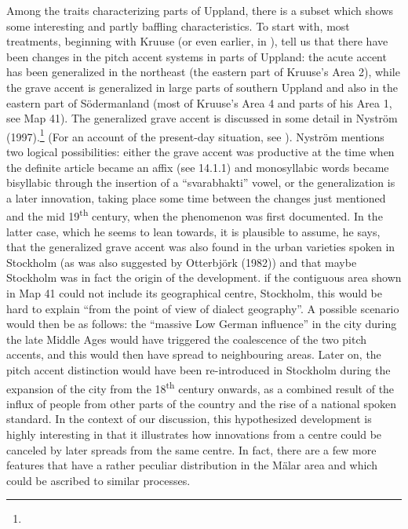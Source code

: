 \begin{styleBodytextC}
Among the traits characterizing parts of Uppland, there is a subset which shows some interesting and partly baffling characteristics. To start with, most treatments, beginning with Kruuse (or even earlier, in \citet{Rydqvist1868}), tell us that there have been changes in the pitch accent systems in parts of Uppland: the acute accent has been generalized in the northeast (the eastern part of Kruuse’s Area 2), while the grave accent is generalized in large parts of southern Uppland and also in the eastern part of Södermanland (most of Kruuse’s Area 4 and parts of his Area 1, see Map 41). The generalized grave accent is discussed in some detail in Nyström (1997).\footnote{} (For an account of the present-day situation, see \citet{Ericsson2006}). Nyström mentions two logical possibilities: either the grave accent was productive at the time when the definite article became an affix (see 14.1.1) and monosyllabic words became bisyllabic through the insertion of a “svarabhakti” vowel, or the generalization is a later innovation, taking place some time between the changes just mentioned and the mid 19\textsuperscript{th} century, when the phenomenon was first documented. In the latter case, which he seems to lean towards, it is plausible to assume, he says, that the generalized grave accent was also found in the urban varieties spoken in Stockholm (as was also suggested by Otterbjörk (1982)) and that maybe Stockholm was in fact the origin of the development. if the contiguous area shown in Map 41 could not include its geographical centre, Stockholm, this would be hard to explain “from the point of view of dialect geography”. A possible scenario would then be as follows: the “massive Low German influence” in the city during the late Middle Ages would have triggered the coalescence of the two pitch accents, and this would then have spread to neighbouring areas. Later on, the pitch accent distinction would have been re-introduced in Stockholm during the expansion of the city from the 18\textsuperscript{th} century onwards, as a combined result of the influx of people from other parts of the country and the rise of a national spoken standard. In the context of our discussion, this hypothesized development is highly interesting in that it illustrates how innovations from a centre could be canceled by later spreads from the same centre. In fact, there are a few more features that have a rather peculiar distribution in the Mälar area and which could be ascribed to similar processes. 

\end{styleBodytextC}

